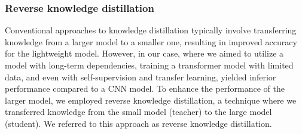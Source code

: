 \documentclass[10pt,twocolumn,letterpaper]{article}
\begin{document}
\subsubsection{Reverse knowledge distillation}
Conventional approaches to knowledge distillation typically involve transferring knowledge from a larger model to a smaller one, resulting in improved accuracy for the lightweight model. However, in our case, where we aimed to utilize a model with long-term dependencies, training a transformer model with limited data, and even with self-supervision and transfer learning, yielded inferior performance compared to a CNN model. To enhance the performance of the larger model, we employed reverse knowledge distillation, a technique where we transferred knowledge from the small model (teacher) to the large model (student). We referred to this approach as reverse knowledge distillation. 
\end{document}
